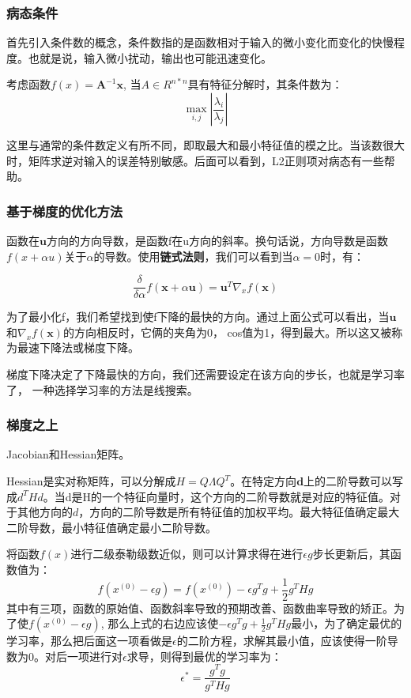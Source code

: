 \subsubsection{病态条件}

首先引入条件数的概念，条件数指的是函数相对于输入的微小变化而变化的快慢程度。也就是说，输入微小扰动，输出也可能迅速变化。

考虑函数$f(x)= \mathbf{A}^{-1} \mathbf{x}$, 当$A \in R^{n * n}$具有特征分解时，其条件数为：
\begin{displaymath}
\max_{i, j} \left| \frac{\lambda_i}{\lambda_j} \right|
\end{displaymath}

这里与通常的条件数定义有所不同，即取最大和最小特征值的模之比。当该数很大时，矩阵求逆对输入的误差特别敏感。后面可以看到，L2正则项对病态有一些帮助。

\subsubsection{基于梯度的优化方法}

函数在$\mathbf{u}$方向的方向导数，是函数f在u方向的斜率。换句话说，方向导数是函数$f(x+\alpha u)$关于$\alpha$的导数。使用\textbf{链式法则}，我们可以看到当$\alpha=0$时，有：

\begin{displaymath}
\frac{\delta}{\delta \alpha} f(\mathbf{x} + \alpha \mathbf{u}) = \mathbf{u}^T \nabla_x f(\mathbf{x})
\end{displaymath}

为了最小化f，我们希望找到使f下降的最快的方向。通过上面公式可以看出，当$\mathbf{u}$和$\nabla_x f(\mathbf{x})$的方向相反时，它俩的夹角为0， cos值为1，得到最大。所以这又被称为最速下降法或梯度下降。

梯度下降决定了下降最快的方向，我们还需要设定在该方向的步长，也就是学习率了， 一种选择学习率的方法是线搜索。

\subsubsection{梯度之上}

Jacobian和Hessian矩阵。

Hessian是实对称矩阵，可以分解成$H = Q\varLambda Q^T$。在特定方向$\mathbf{d}$上的二阶导数可以写成$d^THd$。当d是H的一个特征向量时，这个方向的二阶导数就是对应的特征值。对于其他方向的$d$，方向的二阶导数是所有特征值的加权平均。最大特征值确定最大二阶导数，最小特征值确定最小二阶导数。

将函数$f(x)$进行二级泰勒级数近似，则可以计算求得在进行$\epsilon g$步长更新后，其函数值为：
\begin{displaymath}
f(x^{(0)}-\epsilon g) = f(x^{(0)}) - \epsilon g^T g + \frac{1}{2}g^T H g
\end{displaymath}
其中有三项，函数的原始值、函数斜率导致的预期改善、函数曲率导致的矫正。为了使$f(x^{(0)}-\epsilon g) $, 那么上式的右边应该使$-\epsilon g^T g + \frac{1}{2}g^T H g$最小，为了确定最优的学习率，那么把后面这一项看做是$\epsilon$的二阶方程，求解其最小值，应该使得一阶导数为0。对后一项进行对$\epsilon$求导，则得到最优的学习率为：
\begin{displaymath}
\epsilon^{*} = \frac{g^Tg}{g^THg}
\end{displaymath}

